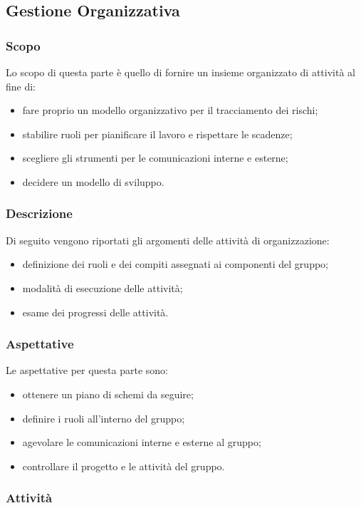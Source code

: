 \subsection{Gestione Organizzativa}
\subsubsection{Scopo}
Lo scopo di questa parte è quello di fornire un insieme organizzato di attività al fine di:
\begin{itemize}
    \item fare proprio un modello organizzativo per il tracciamento dei rischi;
    \item stabilire ruoli per pianificare il lavoro e rispettare le scadenze;
    \item scegliere gli strumenti per le comunicazioni interne e esterne;
    \item decidere un modello di sviluppo.
\end{itemize}

\subsubsection{Descrizione}
Di seguito vengono riportati gli argomenti delle attività di organizzazione:
\begin{itemize}
    \item definizione dei ruoli e dei compiti assegnati ai componenti del gruppo;
    \item modalità di esecuzione delle attività;
    \item esame dei progressi delle attività.
\end{itemize}

\subsubsection{Aspettative}
Le aspettative per questa parte sono:
\begin{itemize}
    \item ottenere un piano di schemi da seguire;
    \item definire i ruoli all'interno del gruppo;
    \item agevolare le comunicazioni interne e esterne al gruppo;
    \item controllare il progetto e le attività del gruppo.
\end{itemize}

\subsubsection{Attività}
